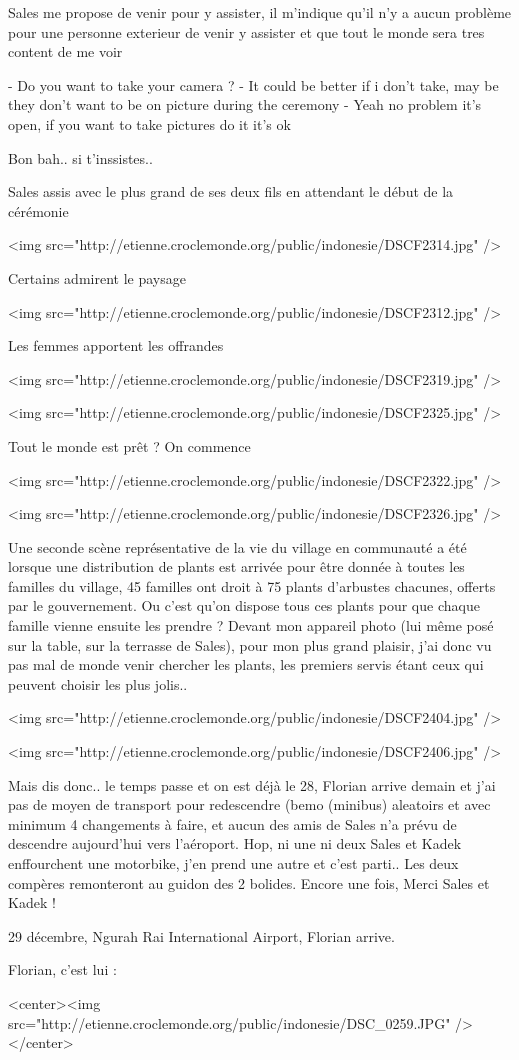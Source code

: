 Sales me propose de venir pour y assister, il m'indique qu'il n'y a aucun problème pour une personne exterieur de venir y assister et que tout le monde sera tres content de me voir

- Do you want to take your camera ?
- It could be better if i don't take, may be they don't want to be on picture during the ceremony
- Yeah no problem it's open, if you want to take pictures do it it's ok

Bon bah.. si t'inssistes..

Sales assis avec le plus grand de ses deux fils en attendant le début de la cérémonie

<img src="http://etienne.croclemonde.org/public/indonesie/DSCF2314.jpg" />

Certains admirent le paysage

<img src="http://etienne.croclemonde.org/public/indonesie/DSCF2312.jpg" />

Les femmes apportent les offrandes

<img src="http://etienne.croclemonde.org/public/indonesie/DSCF2319.jpg" />

<img src="http://etienne.croclemonde.org/public/indonesie/DSCF2325.jpg" />

Tout le monde est prêt ? On commence

<img src="http://etienne.croclemonde.org/public/indonesie/DSCF2322.jpg" />

<img src="http://etienne.croclemonde.org/public/indonesie/DSCF2326.jpg" />

Une seconde scène représentative de la vie du village en communauté a été lorsque une distribution de plants est arrivée pour être donnée à toutes les familles du village, 45 familles ont droit à 75 plants d'arbustes chacunes, offerts par le gouvernement. Ou c'est qu'on dispose tous ces plants pour que chaque famille vienne ensuite les prendre ? Devant mon appareil photo (lui même posé sur la table, sur la terrasse de Sales), pour mon plus grand plaisir, j'ai donc vu pas mal de monde venir chercher les plants, les premiers servis étant ceux qui peuvent choisir les plus jolis..

<img src="http://etienne.croclemonde.org/public/indonesie/DSCF2404.jpg" />

<img src="http://etienne.croclemonde.org/public/indonesie/DSCF2406.jpg" />

Mais dis donc.. le temps passe et on est déjà le 28, Florian arrive demain et j'ai pas de moyen de transport pour redescendre (bemo (minibus) aleatoirs et avec minimum 4 changements à faire, et aucun des amis de Sales n'a prévu de descendre aujourd'hui vers l'aéroport. Hop, ni une ni deux Sales et Kadek enffourchent une motorbike, j'en prend une autre et c'est parti.. Les deux compères remonteront au guidon des 2 bolides. Encore une fois, Merci Sales et Kadek !

29 décembre, Ngurah Rai International Airport, Florian arrive.

Florian, c'est lui :

<center><img src="http://etienne.croclemonde.org/public/indonesie/DSC_0259.JPG" /></center>
